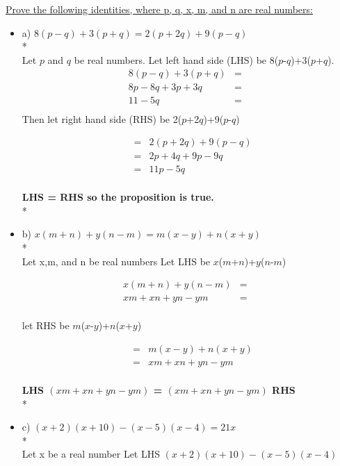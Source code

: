 \documentclass[11pt]{article}
\begin{document}
	{\underline{Prove the following identities, where p, q, x, m, and n are real numbers:}}
	\begin{itemize}

	\item [] a)
	{\underline{$8(p-q)+3(p+q)=2(p+2q)+9(p-q)$}}\\*\\
	 
	 Let $p$ and $q$ be real numbers.
	 Let left hand side (LHS) be 8($p$-$q$)+3($p$+$q$).
	 	\begin{eqnarray*}
	 	8(p-q)+3(p+q)&=&\\
	 	8p-8q+3p+3q&=&\\
	 	11-5q&=&\\
	 	\end{eqnarray*}
	 	\newpage
	 	Then let right hand side (RHS) be 2($p$+2$q$)+9($p$-$q$)
	 	
	 	\begin{eqnarray*}
	 	&=& 2(p+2q)+9(p-q)\\
	 	&=& 2p+4q+9p-9q\\
	 	&=& 11p-5q\\
	 	\end{eqnarray*}
	 	
	 	{\textbf{LHS = RHS so the proposition is true.}}\\*\\
	 	
	 \item[] b)
	 {\underline{$x(m+n)+y(n-m)=m(x-y)+n(x+y)$}}\\*\\
	 
	 Let x,m, and n be real numbers
	 Let LHS be $x$($m$+$n$)+$y$($n$-$m$)
	 
	 \begin{eqnarray*}
	 x(m+n)+y(n-m)&=&\\
	 xm+xn+yn-ym&=&\\
	 \end{eqnarray*}
	
	let RHS be $m$($x$-$y$)+$n$($x$+$y$)
	
	\begin{eqnarray*}
	&=& m(x-y)+n(x+y)\\
	&=& xm+xn+yn-ym\\
	\end{eqnarray*}
	
	\textbf{LHS $(xm+xn+yn-ym)$ = $(xm+xn+yn-ym)$ RHS}\\*\\

	\item[] c)	
	{\underline{$(x+2)(x+10)-(x-5)(x-4)=21x$}}\\*\\
	Let x be a real number
	Let LHS $(x+2)(x+10)-(x-5)(x-4)$
	 	

\end{itemize}
\end{document}
